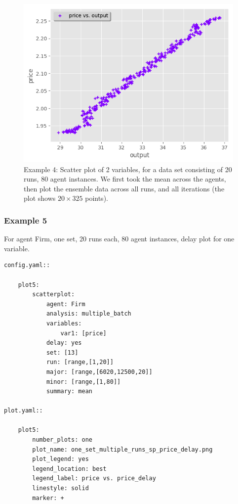 \documentclass[10pt,a4paper]{article}
\begin{document}
\begin{figure}[b!]\centering\leavevmode
\includegraphics[scale=.7]{./plots_tut_2/one_set_multiple_runs_sp_price_output_0.png}
\caption{\footnotesize  Example 4: Scatter plot of 2 variables, for a data set consisting of 20 runs, 80 agent instances. We first took the mean across the agents, then plot the ensemble data across all runs, and all iterations (the plot shows $20\times 325$ points).}
\end{figure}

\clearpage
\subsubsection{Example 5}
 For agent Firm, one set, 20 runs each, 80 agent instances, delay plot for one variable.

\begin{lstlisting}
config.yaml::

    plot5:
        scatterplot:
            agent: Firm
            analysis: multiple_batch
            variables:
                var1: [price]
            delay: yes
            set: [13]
            run: [range,[1,20]]
            major: [range,[6020,12500,20]]
            minor: [range,[1,80]] 
            summary: mean

plot.yaml::

    plot5:
        number_plots: one
        plot_name: one_set_multiple_runs_sp_price_delay.png
        plot_legend: yes
        legend_location: best
        legend_label: price vs. price_delay
        linestyle: solid
        marker: +
\end{lstlisting}
\end{document}
